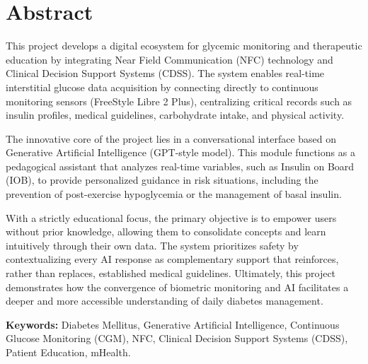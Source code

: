 \chapter*{Abstract}
This project develops a digital ecosystem for glycemic monitoring and therapeutic education by integrating Near Field Communication (NFC) technology and Clinical Decision Support Systems (CDSS). The system enables real-time interstitial glucose data acquisition by connecting directly to continuous monitoring sensors (FreeStyle Libre 2 Plus), centralizing critical records such as insulin profiles, medical guidelines, carbohydrate intake, and physical activity.

The innovative core of the project lies in a conversational interface based on Generative Artificial Intelligence (GPT-style model). This module functions as a pedagogical assistant that analyzes real-time variables, such as Insulin on Board (IOB), to provide personalized guidance in risk situations, including the prevention of post-exercise hypoglycemia or the management of basal insulin.

With a strictly educational focus, the primary objective is to empower users without prior knowledge, allowing them to consolidate concepts and learn intuitively through their own data. The system prioritizes safety by contextualizing every AI response as complementary support that reinforces, rather than replaces, established medical guidelines. Ultimately, this project demonstrates how the convergence of biometric monitoring and AI facilitates a deeper and more accessible understanding of daily diabetes management.
\vspace{.5cm}

\textbf{Keywords:} Diabetes Mellitus, Generative Artificial Intelligence, Continuous Glucose Monitoring (CGM), NFC, Clinical Decision Support Systems (CDSS), Patient Education, mHealth.